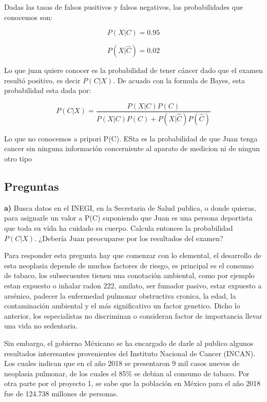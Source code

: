 \documentclass{article}
\begin{document}
Dadas las tasas de falsos pusitivos y falsos negativos, las probabilidades que conocemos son:

$$ P(X|C) = 0.95$$

$$P(X|\hat{C}) = 0.02$$


\vspace{10pt}

Lo que juan quiere conocer es la probabilidad de tener cáncer dado que el examen resultó positivo, es decir $P(C|X)$. De acuado con la formula de Bayes, esta probabilidad esta dada por:


$$ P(C|X) = \frac{P(X|C)P(C)}{P(X|C)P(C) + P(X|\hat{C})P(\hat{C})}$$

\vspace{10pt}

Lo que no conocemos a pripori P(C). ESta es la probabilidad de que Juan tenga cancer sin ninguna información concerniente al aparato de medicion ni de ningun otro tipo


\subsection*{Preguntas}

\textbf{a)} Busca datos en el INEGI, en la Secretaria de Salud publica, o donde quieras, para asignarle un valor a P(C) suponiendo que Juan es una persona deportista que toda su vida ha cuidado su cuerpo. Calcula entonces la probabilidad $P(C|X)$. ¿Debería Juan preocuparse por los resultados del examen?

\vspace{10pt}


Para responder esta pregunta hay que comenzar con lo elemental, el desarrollo de esta neoplasia depende de muchos factores de riesgo, es principal es el consumo de tabaco, los subsecuentes tienen una conotación ambiental, como por ejemplo estan expuesto o inhalar radon 222, amilato, ser fumador pasivo, estar expuesto a arsénico, padecer la enfermedad pulmonar obstructiva cronica, la edad, la contaminación ambiental y el más significativo un factor genetico. Dicho lo anterior, los especialistas no discriminan o consideran factor de importancia llevar una vida no sedentaria. 

\vspace{10pt}


Sin embargo, el gobierno Méxicano se ha encargado de darle al publico algunos resultados interesantes provenientes del Instituto Nacional de Cancer (INCAN). Los cuales indican que en el año 2018 se presentaron 9 mil casos nuevos de neoplasia pulmonar, de los cuales el 85$\%$ se debian al consumo de tabaco. Por otra parte por el proyecto 1, se sabe que la población en México para el año 2018 fue de 124.738 millones de personas. 
\end{document}
